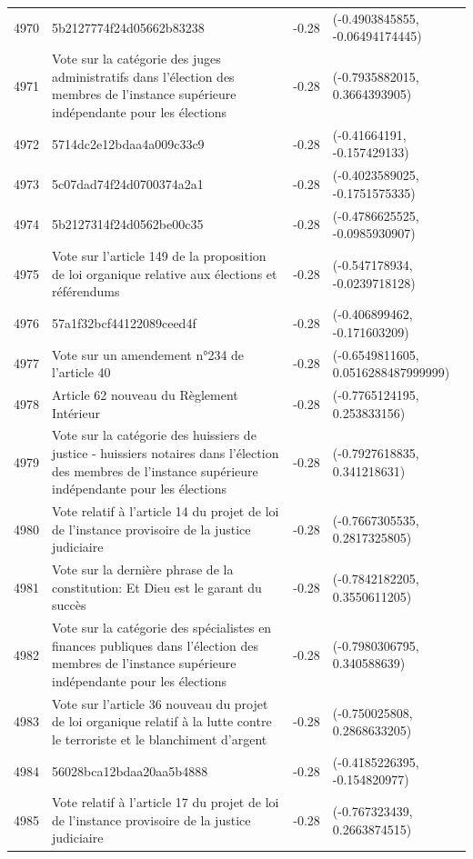 \begin{table}[ht]
\begin{tabular}{rlrl}
  4970 & 5b2127774f24d05662b83238 & -0.28 & (-0.4903845855, -0.06494174445) \\ 
  4971 & Vote sur la catégorie des juges administratifs dans l'élection des membres de l'instance supérieure indépendante pour les élections & -0.28 & (-0.7935882015, 0.3664393905) \\ 
  4972 & 5714dc2e12bdaa4a009c33c9 & -0.28 & (-0.41664191, -0.157429133) \\ 
  4973 & 5c07dad74f24d0700374a2a1 & -0.28 & (-0.4023589025, -0.1751575335) \\ 
  4974 & 5b2127314f24d0562be00c35 & -0.28 & (-0.4786625525, -0.0985930907) \\ 
  4975 & Vote sur l'article 149 de la proposition de loi organique relative aux élections et référendums & -0.28 & (-0.547178934, -0.0239718128) \\ 
  4976 & 57a1f32bcf44122089ceed4f & -0.28 & (-0.406899462, -0.171603209) \\ 
  4977 & Vote sur un amendement n°234 de l'article 40 & -0.28 & (-0.6549811605, 0.0516288487999999) \\ 
  4978 & Article 62 nouveau du Règlement Intérieur & -0.28 & (-0.7765124195, 0.253833156) \\ 
  4979 & Vote sur la catégorie des huissiers de justice - huissiers notaires dans l'élection des membres de l'instance supérieure indépendante pour les élections & -0.28 & (-0.7927618835, 0.341218631) \\ 
  4980 & Vote relatif à l'article 14 du projet de loi de l'instance provisoire de la justice judiciaire & -0.28 & (-0.7667305535, 0.2817325805) \\ 
  4981 & Vote sur la dernière phrase de la constitution: Et Dieu est le garant du succès & -0.28 & (-0.7842182205, 0.3550611205) \\ 
  4982 & Vote sur la catégorie des spécialistes en finances publiques dans l'élection des membres de l'instance supérieure indépendante pour les élections & -0.28 & (-0.7980306795, 0.340588639) \\ 
  4983 & Vote sur l'article 36 nouveau du projet de loi organique relatif à la lutte contre le terroriste et le blanchiment d'argent & -0.28 & (-0.750025808, 0.2868633205) \\ 
  4984 & 56028bca12bdaa20aa5b4888 & -0.28 & (-0.4185226395, -0.154820977) \\ 
  4985 & Vote relatif à l'article 17 du projet de loi de l'instance provisoire de la justice judiciaire & -0.28 & (-0.767323439, 0.2663874515) \\ 

\end{tabular}
\end{table}
